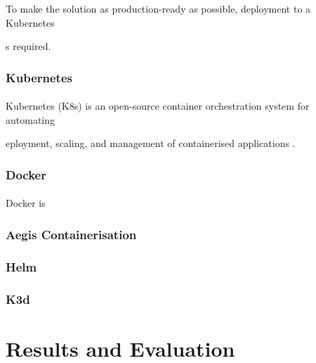 \documentclass[12pt, conference, final, a4paper, onecolumn, compsoc]{IEEEtran}
\begin{document}
To make the solution as production-ready as possible, deployment to a Kubernetes

s required.

\subsubsection*{Kubernetes}
\paragraph{}
Kubernetes (K8s) is an open-source container orchestration system for automating

eployment, scaling, and management of containerised applications \citep{k8s}.

\subsubsection*{Docker}
\paragraph{}
Docker is


\subsubsection*{Aegis Containerisation}
\paragraph{}


\subsubsection*{Helm}
\paragraph{}

\subsubsection*{K3d}
\paragraph{}

\section{Results and Evaluation}
\end{document}
